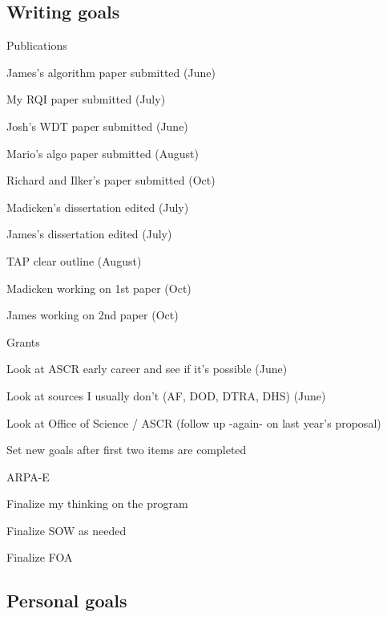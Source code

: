 \documentclass[12pt,twoside]{article}
\begin{document}
\subsection{Writing goals}
\begin{compactitem}
\item Publications
  \begin{compactitem}
  \item James's algorithm paper submitted (June)
  \item My RQI paper submitted (July)
  \item Josh's WDT paper submitted (June)
  \item Mario's algo paper submitted (August)
  \item Richard and Ilker's paper submitted (Oct)
  \item Madicken's dissertation edited (July)
  \item James's dissertation edited (July)
  \item TAP clear outline (August)
  \item Madicken working on 1st paper (Oct)
  \item James working on 2nd paper (Oct)
  \end{compactitem}

\item Grants
  \begin{compactitem}
  \item Look at ASCR early career and see if it's possible (June)
  \item Look at sources I usually don't (AF, DOD, DTRA, DHS) (June)
  \item Look at Office of Science / ASCR (follow up -again- on last year's proposal)
  \item Set new goals after first two items are completed
  \end{compactitem}
 
\item ARPA-E
  \begin{compactitem}
  \item Finalize my thinking on the program
  \item Finalize SOW as needed
  \item Finalize FOA
  \end{compactitem}
\end{compactitem}


\subsection{Personal goals}
\begin{compactitem}
\item 
\item
\item
\end{compactitem}
\end{document}
